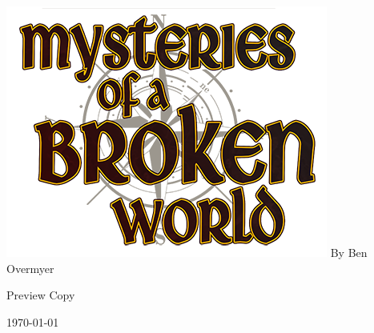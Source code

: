 \documentclass[letterpaper,table]{mysteries}
\begin{document}
\frontmatter
\thispagestyle{empty}

\begin{center}
\includegraphics[center]{logo-mysteries}
By Ben Overmyer

Preview Copy

\today
\end{center}



\setcounter{tocdepth}{2}
\tableofcontents
\newpage

\mainmatter










\printindex
\end{document}
